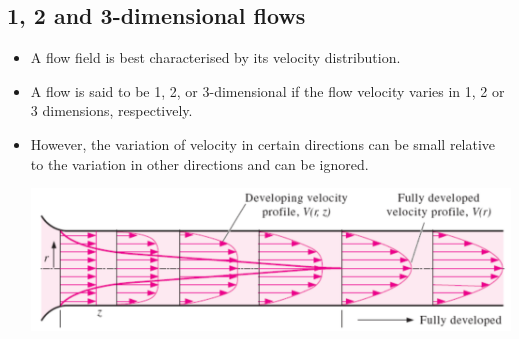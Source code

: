 \documentclass[11pt]{article}
\begin{document}
\subsection{1, 2 and 3-dimensional flows}
\label{sec:org9bf71a9}
\begin{itemize}
\item A flow field is best characterised by its velocity distribution.
\item A flow is said to be 1, 2, or 3-dimensional if the flow velocity varies in 1, 2 or 3 dimensions, respectively.
\item However, the variation of velocity in certain directions can be small relative to the variation in other directions and can be ignored.

\begin{center}
\includegraphics[width=.9\linewidth]{./images/one-two-and-three-dimensional-flows.png}
\end{center}
\end{itemize}
\end{document}
